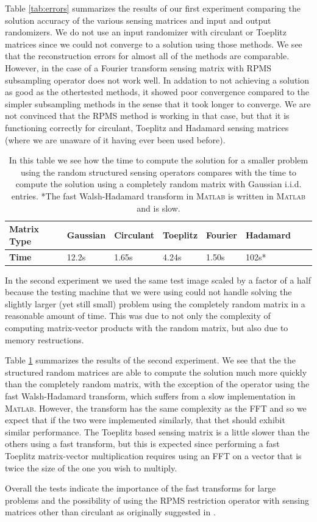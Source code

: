 Table \ref{tab:errors} summarizes the results of our first experiment comparing
the solution accuracy of the various sensing matrices and input and output
randomizers. We do not use an input randomizer with circulant or Toeplitz
matrices since we could not converge to a solution using those methods. We see
that the reconstruction errors for almost all of the methods are comparable.
However, in the case of a Fourier transform sensing matrix with RPMS
subsampling operator does not work well. In addation to not achieving a
solution as good as the othertested methods, it showed poor convergence
compared to the simpler subsampling methods in the sense that it took longer to
converge. We are not convinced that the RPMS method is working in that case,
but that it is functioning correctly for circulant, Toeplitz and Hadamard
sensing matrices (where we are unaware of it having ever been used before). 

\begin{table}[h]
  \begin{tabular}{l|lllllll} 
    \textbf{Matrix Type} & Gaussian & Circulant & Toeplitz & Fourier & Hadamard \\ \hline
    \textbf{Time}        & 12.2s    & 1.65s     & 4.24s    & 1.50s   & 102s*    \\ 
  \end{tabular}
  \label{tab:times}
  \caption{ 
    In this table we see how the time to compute the
    solution for a smaller problem using the random structured sensing
    operators compares with the time to compute the solution using a completely
    random matrix with Gaussian i.i.d. entries. *The fast Walsh-Hadamard
    transform in \textsc{Matlab} is written in \textsc{Matlab} and is slow.
  }
\end{table}

In the second experiment we used the same test image scaled by a factor of a
half because the testing machine that we were using could not handle solving
the slightly larger (yet still small) problem using the completely random
matrix in  a reasonable amount of time. This was due to not only the complexity
of computing matrix-vector products with the random matrix, but also due to
memory restructions.

Table \ref{tab:times} summarizes the results of the second experiment. We see
that the the structured random matrices are able to compute the solution much
more quickly than the completely random matrix, with the exception of the
operator using the fast Walsh-Hadamard transform, which suffers from a slow
implementation in \textsc{Matlab}. However, the transform has the same
complexity as the FFT and so we expect that if the two were implemented
similarly, that thet should exhibit similar performance.  The Toeplitz based
sensing matrix is a little slower than the others using a fast transform, but
this is expected since performing a fast Toeplitz matrix-vector multiplication
requires using an FFT on a vector that is twice the size of the one you wish to
multiply. 

Overall the tests indicate the importance of the fast transforms for large
problems and the possibility of using the RPMS restriction operator with
sensing matrices other than circulant as originally suggested in
\cite{romberg2009}.
